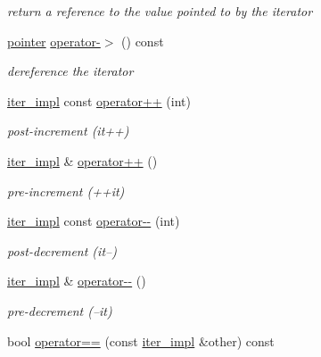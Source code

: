 \begin{DoxyCompactItemize}
\begin{DoxyCompactList}\small\item\em return a reference to the value pointed to by the iterator \end{DoxyCompactList}\item 
\mbox{\hyperlink{classnlohmann_1_1detail_1_1iter__impl_a69e52f890ce8c556fd68ce109e24b360}{pointer}} \mbox{\hyperlink{classnlohmann_1_1detail_1_1iter__impl_a6da3d2b34528aff328f3dcb513076dec}{operator-\/$>$}} () const
\begin{DoxyCompactList}\small\item\em dereference the iterator \end{DoxyCompactList}\item 
\mbox{\hyperlink{classnlohmann_1_1detail_1_1iter__impl}{iter\+\_\+impl}} const \mbox{\hyperlink{classnlohmann_1_1detail_1_1iter__impl_a7d2397773b2dce42f30f0375a6a1d850}{operator++}} (int)
\begin{DoxyCompactList}\small\item\em post-\/increment (it++) \end{DoxyCompactList}\item 
\mbox{\hyperlink{classnlohmann_1_1detail_1_1iter__impl}{iter\+\_\+impl}} \& \mbox{\hyperlink{classnlohmann_1_1detail_1_1iter__impl_abdfe2a7f464400a7ab572782d14b922f}{operator++}} ()
\begin{DoxyCompactList}\small\item\em pre-\/increment (++it) \end{DoxyCompactList}\item 
\mbox{\hyperlink{classnlohmann_1_1detail_1_1iter__impl}{iter\+\_\+impl}} const \mbox{\hyperlink{classnlohmann_1_1detail_1_1iter__impl_a1fc43e764467b8ea4a4cdd01f629d757}{operator-\/-\/}} (int)
\begin{DoxyCompactList}\small\item\em post-\/decrement (it--) \end{DoxyCompactList}\item 
\mbox{\hyperlink{classnlohmann_1_1detail_1_1iter__impl}{iter\+\_\+impl}} \& \mbox{\hyperlink{classnlohmann_1_1detail_1_1iter__impl_a84e689fb581d651d130039f7cb81494a}{operator-\/-\/}} ()
\begin{DoxyCompactList}\small\item\em pre-\/decrement (--it) \end{DoxyCompactList}\item 
bool \mbox{\hyperlink{classnlohmann_1_1detail_1_1iter__impl_a2b592605b63ae7f5401996ffa3b14393}{operator==}} (const \mbox{\hyperlink{classnlohmann_1_1detail_1_1iter__impl}{iter\+\_\+impl}} \&other) const

\end{DoxyCompactItemize}
